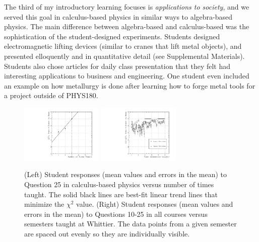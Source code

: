 \documentclass[../../main.tex]{subfiles}
\begin{document}
The third of my introductory learning focuses is \textit{applications to society}, and we served this goal in calculus-based physics in similar ways to algebra-based physics.  The main difference between algebra-based and calculus-based was the sophistication of the student-designed experiments.  Students designed electromagnetic lifting devices (similar to cranes that lift metal objects), and presented elloquently and in quantitative detail (see Supplemental Materials).  Students also chose articles for daily class presentation that they felt had interesting applications to business and engineering.  One student even included an example on how metallurgy is done after learning how to forge metal tools for a project outside of PHYS180. \\ \hspace{0.1cm}

\begin{figure}
\centering
\includegraphics[width=0.35\textwidth]{Q25_calculus_based.pdf}
\includegraphics[width=0.35\textwidth]{Q10_Q25_all_courses_vs_time.pdf}
\caption{\label{fig:courses:intro_q25_2}  (Left) Student responses (mean values and errors in the mean) to Question 25 in calculus-based physics versus number of times taught.  The solid black lines are best-fit linear trend lines that minimize the $\chi^2$ value. (Right) Student responses (mean values and errors in the mean) to Questions 10-25 in all courses versus semesters taught at Whittier.  The data points from a given semester are spaced out evenly so they are individually visible.}
\end{figure}
\end{document}
